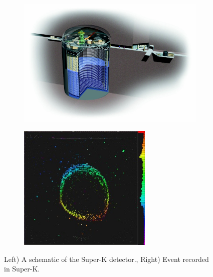 \begin{figure}[h!]
\centering
\begin{subfigure}{.5\textwidth}
  \centering
\includegraphics[width=\textwidth]{figures/SK3D.jpg}
\vspace{2mm}
\end{subfigure}%
\begin{subfigure}{.5\textwidth}
  \centering
\includegraphics[width=0.7\textwidth]{figures/SuperKMuon-300x282.jpg}
\vspace{2mm}
\end{subfigure}
\vspace{2mm}
\caption{Left) A schematic of the Super-K detector., Right) Event recorded in Super-K.}
\label{fig:SK}
\end{figure}

